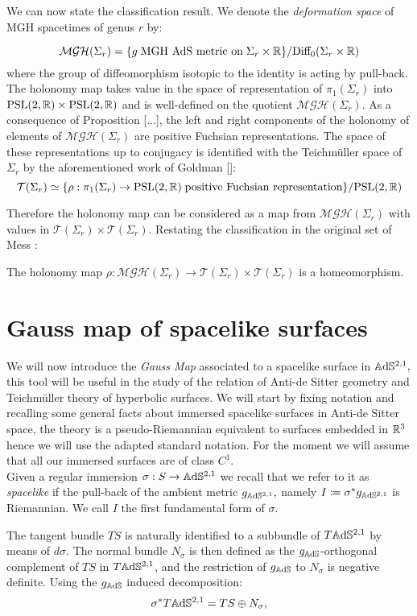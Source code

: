 We can now state the classification result. We denote the \textit{deformation space} of MGH spacetimes of genus $r$ by:

\[
    \mathcal{MGH}(\Sigma_r)=\{g\;\text{MGH AdS metric on}\;\Sigma_r\times\mathbb{R}\}/\text{Diff}_0(\Sigma_r\times\mathbb{R})
\]
where the group of diffeomorphism isotopic to the identity is acting by pull-back. The holonomy map takes value in the space of representation of $\pi_1(\Sigma_r)$ into $\text{PSL}(2,\mathbb{R})\times\text{PSL}(2,\mathbb{R})$ and is well-defined on the quotient $ \mathcal{MGH}(\Sigma_r).$
As a consequence of Proposition [...], the left and right components of the holonomy of elements of $ \mathcal{MGH}(\Sigma_r)$ are positive Fuchsian representations. The space of these representations up to conjugacy is identified with the Teichm\"uller space of $\Sigma_r$ by the aforementioned work of Goldman []:
\[
    \mathcal{T}(\Sigma_r)\simeq\{\rho:\pi_1(\Sigma_r)\to\text{PSL}(2,\mathbb{R})\;\text{positive Fuchsian representation}\}/\text{PSL}(2,\mathbb{R})
\]

Therefore the holonomy map can be considered as a map from $ \mathcal{MGH}(\Sigma_r)$ with values in $\mathcal{T}(\Sigma_r)\times\mathcal{T}(\Sigma_r).$ Restating the classification in the original set of Mess \cite{Mess}: 
\begin{theorem}\label{554}
    The holonomy map $\rho:\mathcal{MGH}(\Sigma_r)\to\mathcal{T}(\Sigma_r)\times\mathcal{T}(\Sigma_r)$ is a homeomorphism.
\end{theorem}
\section{Gauss map of spacelike surfaces}
    We will now introduce the \textit{Gauss Map} associated to a spacelike surface in $\mathbb{A}\mathrm{d}\mathbb{S}^{2,1},$ this tool will be useful in the study of the relation of Anti-de Sitter geometry and Teichm\"uller theory of hyperbolic surfaces.
\noindent We will start by fixing notation and recalling some general facts about immersed spacelike surfaces in Anti-de Sitter space, the theory is a pseudo-Riemannian equivalent to surfaces embedded in $\mathbb{R}^3$ hence we will use the adapted standard notation. For the moment we will assume that all our immersed surfaces are of class $C^1$. \\
    Given a regular immersion $\sigma: S\to\mathbb{A}\mathrm{d}\mathbb{S}^{2,1}$ we recall that we refer to it as \textit{spacelike} if the pull-back of the ambient metric $g_{\mathbb{A}\mathrm{d}\mathbb{S}^{2,1}},$ namely $I\coloneqq\sigma^*g_{\mathbb{A}\mathrm{d}\mathbb{S}^{2,1}}$ is Riemannian. We call $I$ the first fundamental form of $\sigma$. 

The tangent bundle $TS$ is naturally identified to a subbundle of $T\mathbb{A}\mathrm{d}\mathbb{S}^{2,1}$ by means of $d\sigma$. The normal bundle $N_\sigma$ is then defined as the $g_{\mathbb{A}\mathrm{d}\mathbb{S}}$-orthogonal complement of $TS$ in $T\mathbb{A}\mathrm{d}\mathbb{S}^{2,1}$, and the restriction of $g_{\mathbb{A}\mathrm{d}\mathbb{S}}$ to $N_\sigma$ is negative definite. Using the $g_{\mathbb{A}\mathrm{d}\mathbb{S}}$ induced decomposition: 
\[
\sigma^*T\mathbb{A}\mathrm{d}\mathbb{S}^{2,1}=TS\oplus N_\sigma,    
\]

